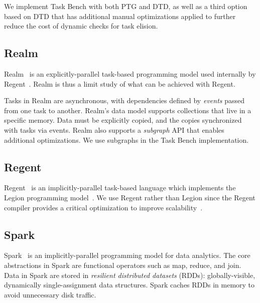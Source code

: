 We implement Task Bench with both PTG and DTD, as well as a third
option based on DTD that has additional manual optimizations applied
to further reduce the cost of dynamic checks for task elision.


\subsection{Realm}

Realm~\cite{Realm14} is an explicitly-parallel task-based programming
model used internally by Regent~\cite{Regent15}. Realm is thus a limit
study of what can be achieved with Regent.

Tasks in Realm are asynchronous, with dependencies
defined by \emph{events} passed from one task
to another. Realm's data model supports collections that live in a
specific memory. Data must be explicitly copied, and the copies
synchronized with tasks via events.
Realm also supports a \emph{subgraph} API that enables additional
optimizations. We use subgraphs in the Task
Bench implementation.

\subsection{Regent}

Regent~\cite{Regent15} is an implicitly-parallel task-based language
which implements the Legion programming model~\cite{Legion12}. We use
Regent rather than Legion since the Regent compiler
provides a critical optimization to
improve scalability~\cite{ControlReplication17}.

\subsection{Spark}

Spark~\cite{Spark10} is an implicitly-parallel programming model for
data analytics.
The core abstractions in Spark are functional operators such as map,
reduce, and join. Data in Spark are stored in
\emph{resilient
  distributed datasets} (RDDs): globally-visible,
dynamically single-assignment data structures. Spark caches RDDs in memory to avoid unnecessary
disk traffic.


